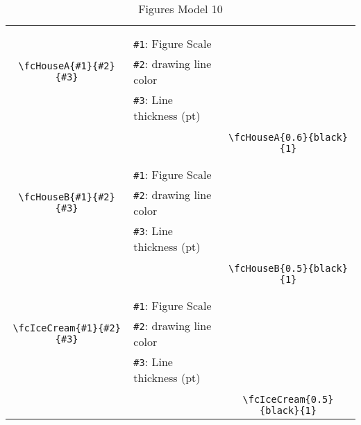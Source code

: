 \documentclass[x11names]{article}
\begin{document}
\begin{table}[H]
\begin{tabular}{|c|l|c|}
	&&\multirow{5}{*}{\fcHouseA{0.6}{black}{1}}\\	&&\\	&\verb|#1|: Figure Scale &\\	\verb|\fcHouseA{#1}{#2}{#3}|&	\verb|#2|: drawing line color &\\	&\verb|#3|: Line thickness (pt) &\\ &&\\&&	\verb|\fcHouseA{0.6}{black}{1}|\\\hline 	
	&&\multirow{5}{*}{\fcHouseB{0.5}{black}{1}}\\	&&\\	&\verb|#1|: Figure Scale &\\	\verb|\fcHouseB{#1}{#2}{#3}|&	\verb|#2|: drawing line color &\\	&\verb|#3|: Line thickness (pt) &\\ &&\\&&	\verb|\fcHouseB{0.5}{black}{1}|\\\hline 	
	&&\multirow{5}{*}{\fcIceCream{0.5}{black}{1}}\\	&&\\	&\verb|#1|: Figure Scale &\\	\verb|\fcIceCream{#1}{#2}{#3}|&	\verb|#2|: drawing line color &\\	&\verb|#3|: Line thickness (pt) &\\ &&\\&&	\verb|\fcIceCream{0.5}{black}{1}|\\\hline 	\hline\end{tabular}\caption{Figures Model 10}\label{tab10}\end{table}
\end{document}
